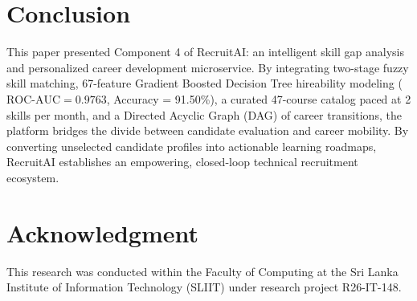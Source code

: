 \documentclass[conference]{IEEEtran}
\begin{document}
\section{Conclusion}
This paper presented Component 4 of RecruitAI: an intelligent skill gap analysis and personalized career development microservice. By integrating two-stage fuzzy skill matching, 67-feature Gradient Boosted Decision Tree hireability modeling ($\text{ROC-AUC} = 0.9763$, Accuracy = 91.50\%), a curated 47-course catalog paced at 2 skills per month, and a Directed Acyclic Graph (DAG) of career transitions, the platform bridges the divide between candidate evaluation and career mobility. By converting unselected candidate profiles into actionable learning roadmaps, RecruitAI establishes an empowering, closed-loop technical recruitment ecosystem.

\section*{Acknowledgment}
This research was conducted within the Faculty of Computing at the Sri Lanka Institute of Information Technology (SLIIT) under research project R26-IT-148.



\end{document}
